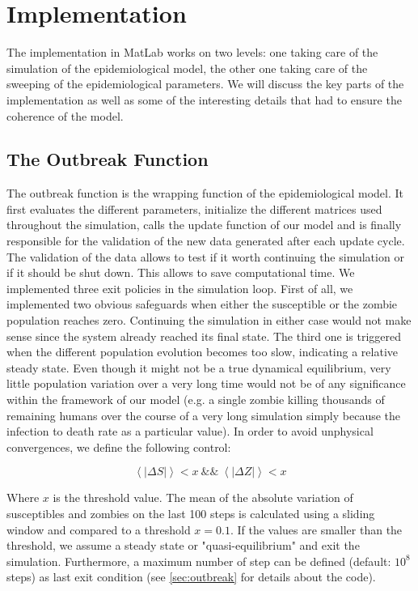 \documentclass[11pt]{article} %
\begin{document}
\newpage
\section{Implementation}\indent

The implementation in MatLab works on two levels: one taking care of the simulation of the epidemiological model, the other one taking care of the sweeping of the epidemiological parameters. We will discuss the key parts of the implementation as well as some of the interesting details that had to ensure the coherence of the model.


\subsection{The Outbreak Function}\indent

The outbreak function is the wrapping function of the epidemiological model. It first evaluates the different parameters, initialize the different matrices used throughout the simulation, calls the update function of our model and is finally responsible for the validation of the new data generated after each update cycle. The validation of the data allows to test if it worth continuing the simulation or if it should be shut down. This allows to save computational time. We implemented three exit policies in the simulation loop. First of all, we implemented two obvious safeguards when either the susceptible or the zombie population reaches zero. Continuing the simulation in either case would not make sense since the system already reached its final state. The third one is triggered when the different population evolution becomes too slow, indicating a relative steady state. Even though it might not be a true dynamical equilibrium, very little population variation over a very long time would not be of any significance within the framework of our model (e.g. a single zombie killing thousands of remaining humans over the course of a very long simulation simply because the infection to death rate as a particular value). In order to avoid unphysical convergences, we define the following control:

\bigskip
\begin{equation} \label{eq:outbreakequilibrium}
\left\langle \left| \Delta S \right| \right\rangle < x\ \&\&\ \left\langle\left|\Delta Z \right| \right\rangle < x
\end{equation}
\bigskip

Where $x$ is the threshold value. The mean of the absolute variation of susceptibles and zombies on the last 100 steps is calculated using a sliding window and compared to a threshold $x = 0.1$. If the values are smaller than the threshold, we assume a steady state or "quasi-equilibrium" and exit the simulation. Furthermore, a maximum number of step can be defined (default: $10^8$ steps) as last exit condition (see \ref{sec:outbreak} for details about the code).
\end{document}
